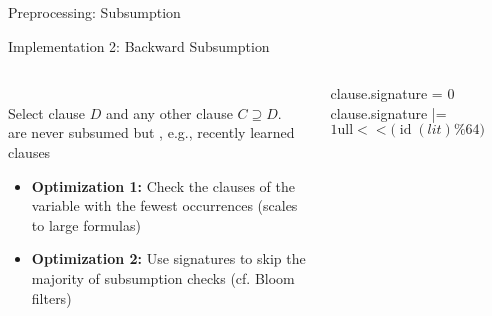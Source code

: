 \documentclass[t]{sdqbeamer}
\begin{document}
\begin{frame}{Preprocessing: Subsumption}
\begin{block}{Implementation 2: Backward Subsumption}
\begin{columns}[T]
\begin{column}{.45\linewidth}~\\
    Select clause $D$ and  any other clause $C \supseteq D$.\\[1ex]
     are never subsumed but , e.g., recently learned clauses
    \begin{itemize}\setlength{\itemsep}{1ex}
        \item \textbf{Optimization 1:} Check the clauses of the variable with the fewest occurrences (scales to large formulas)
        \item \textbf{Optimization 2:} Use signatures to skip the majority of subsumption checks (cf. Bloom filters)
    \end{itemize}
\end{column}
\begin{column}{.5\linewidth}
    \begin{algorithm}[H]
        \DontPrintSemicolon
        \caption{Signature-based Subsumption Check}
         {
            clause.signature = 0\;
             {
                clause.signature |= $1\text{ull} << \bigl(\mathop{id}(lit) \% 64\bigr)$\;
            }
        }
        \BlankLine
         {
        }
    \end{algorithm}
\end{column}
\end{columns}
\end{block}
\end{frame}
    
\end{document}
